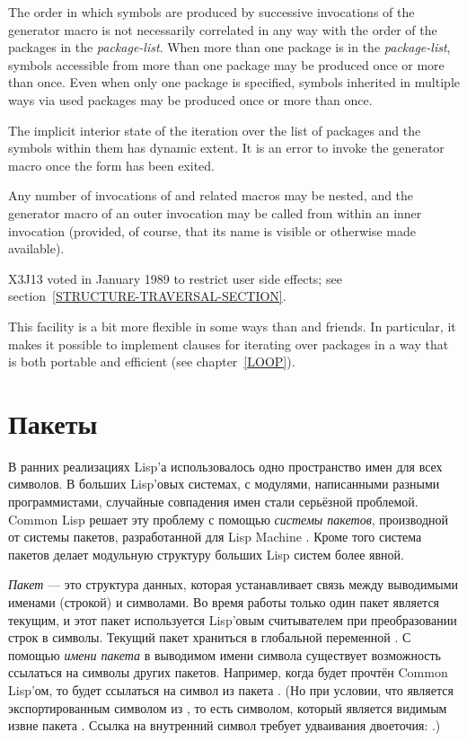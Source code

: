 \begin{defmac}
The order in which symbols are produced by successive invocations
of the generator macro is not necessarily correlated in any way
with the order of the packages in the \emph{package-list}.
When more than one package is in the \emph{package-list},
symbols accessible from more than one package may be produced
once or more than once.  Even when only one package is specified,
symbols inherited in multiple ways via used packages may be
produced once or more than once.

The implicit interior state of the iteration over the list of packages
and the symbols within them has dynamic extent.
It is an error to invoke the generator macro
once the  form has been exited.

Any number of invocations of 
and related macros may be nested, and the generator macro of an
outer invocation may be called from within an inner invocation
(provided, of course, that its name is visible or otherwise made available).

X3J13 voted in January 1989
to restrict user side effects; see section~\ref{STRUCTURE-TRAVERSAL-SECTION}.

\beforenoterule
\begin{rationale}
This facility is a bit more flexible in some ways than 
and friends.
In particular, it makes it possible to implement 
clauses for iterating over packages in a way that is both portable
and efficient (see chapter~\ref{LOOP}).
\end{rationale}
\afternoterule
\end{defmac}

\else

\chapter{Пакеты}
\label{XPACK}

В ранних реализациях Lisp'а использовалось одно пространство имен для всех
символов. В больших Lisp'овых системах, с 
модулями, написанными разными программистами, случайные совпадения имен стали
серьёзной проблемой. Common Lisp решает эту проблему с помощью \emph{системы
 пакетов}, производной от системы пакетов, разработанной для Lisp
Machine \cite{BLUE-LISPM}.
Кроме того система пакетов делает модульную структуру больших Lisp систем более
явной.

\emph{Пакет} --- это структура данных, которая устанавливает связь между
выводимыми именами (строкой) и символами. Во время работы только один пакет
является текущим, и этот пакет используется Lisp'овым 
считывателем при преобразовании строк в символы. Текущий пакет храниться в
глобальной переменной . С помощью 
\emph{имени пакета} в выводимом имени символа существует возможность
ссылаться на символы других пакетов.
Например, когда  будет прочтён Common Lisp'ом, то будет ссылаться на
символ  из пакета .
(Но при условии, что  является экспортированным символом из
, то есть символом, который является видимым извне пакета . Ссылка на
внутренний символ требует удваивания двоеточия: .)

